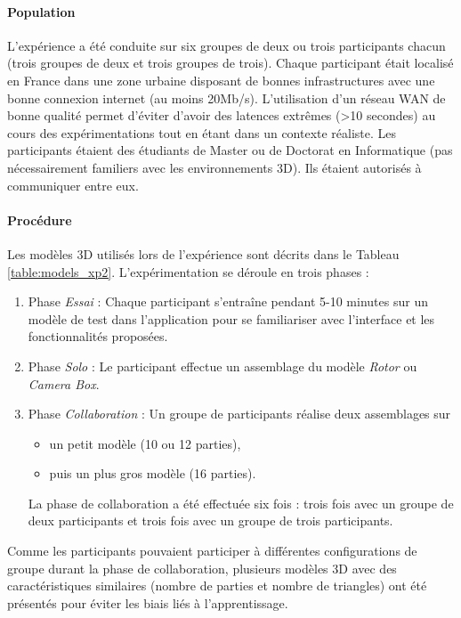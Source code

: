 \paragraph{Population}
L'expérience a été conduite sur six groupes de deux ou trois participants chacun 
(trois groupes de deux et trois groupes de trois). 
Chaque participant était localisé en France dans une zone urbaine disposant de 
bonnes infrastructures avec une bonne connexion 
internet (au moins 20Mb/s). L'utilisation d'un réseau \gls{WAN} de bonne qualité 
permet d'éviter d'avoir des latences extrêmes (>10 secondes) au cours 
des expérimentations tout en étant dans un contexte réaliste. 
Les participants étaient des étudiants de Master ou de Doctorat en Informatique 
(pas nécessairement familiers avec les environnements 
3D). Ils étaient autorisés à communiquer entre eux.

\paragraph{Procédure}
Les modèles \gls{3D} utilisés lors de l'expérience sont décrits dans le Tableau 
\ref{table:models_xp2}. L'expérimentation se déroule en trois phases : 
\begin{enumerate}
	\item Phase \textit{Essai} : Chaque participant s'entraîne pendant 5-10 minutes 
	sur un 
	modèle de test dans l'application pour se familiariser avec l'interface et les 
	fonctionnalités proposées.
	\item Phase \textit{Solo} : Le participant effectue un assemblage du modèle 
	\textit{Rotor} ou 
	\textit{Camera Box}.
	\item Phase \textit{Collaboration} : Un groupe de participants réalise deux 
	assemblages sur 
	\begin{itemize}
		\item un petit modèle (10 ou 12 parties), 
		\item puis un plus gros modèle (16 parties).
	\end{itemize}
	La phase de collaboration a été effectuée six fois : trois fois 
	avec un groupe de deux participants et trois fois avec un groupe de trois 
	participants.
\end{enumerate}

Comme les participants pouvaient participer à différentes configurations de 
groupe durant la phase de collaboration, plusieurs modèles \gls{3D} avec des 
caractéristiques similaires (nombre de parties et nombre de triangles) ont été 
présentés pour éviter les biais liés à l'apprentissage.


